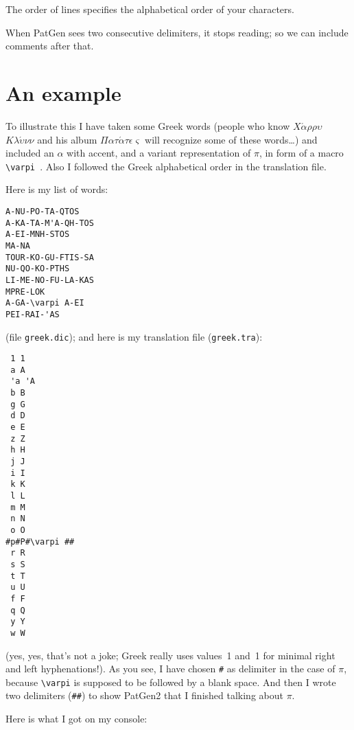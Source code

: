 The order of lines specifies the alphabetical order of your characters.

When PatGen sees two consecutive delimiters,
it stops reading; so we can include
comments after that.

\section{An example}
To illustrate this I have taken some
Greek words (people who know $X\acute\alpha%
\rho\rho\upsilon$ $K\lambda\acute\upsilon\nu\nu$
and his album $\Pi\alpha\tau%
\acute\alpha\tau\epsilon\varsigma$ will recognize some of these
words\ldots) and included an $\alpha$ with accent, and a variant
representation of $\pi$, in form of a macro \verb*=\varpi =. Also I
followed the Greek alphabetical order in the translation file.

Here is my list of words:

\begin{verbatim}
A-NU-PO-TA-QTOS
A-KA-TA-M'A-QH-TOS
A-EI-MNH-STOS
MA-NA
TOUR-KO-GU-FTIS-SA
NU-QO-KO-PTHS
LI-ME-NO-FU-LA-KAS
MPRE-LOK
A-GA-\varpi A-EI
PEI-RAI-'AS
\end{verbatim}

(file {\tt greek.dic}); and here is my translation file ({\tt greek.tra}):

\begin{verbatim}
 1 1
 a A
 'a 'A
 b B
 g G
 d D
 e E
 z Z
 h H
 j J
 i I
 k K
 l L
 m M
 n N
 o O
#p#P#\varpi ##
 r R
 s S
 t T
 u U
 f F
 q Q
 y Y
 w W
\end{verbatim}

(yes, yes, that's not a joke; Greek really uses values~1
and~1 for minimal right
and left hyphenations!). As you see, I have chosen \verb=#= as delimiter
in the case of $\pi$, because \verb=\varpi= is supposed to be followed
by a blank space. And then I wrote two delimiters (\verb=##=) to show PatGen2
that I finished talking about $\pi$.

Here is what I got on my console:


